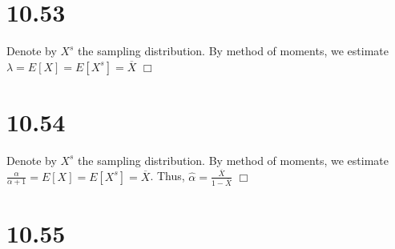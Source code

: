 \documentclass{article}
\begin{document}
\section*{10.53}
Denote by $X^s$ the sampling distribution. By method of moments, we estimate $\lambda = E[X] = E[X^s] = \overline{X}$ $\Box$

\section*{10.54}
Denote by $X^s$ the sampling distribution. By method of moments, we estimate $\frac{\alpha}{\alpha + 1} = E[X] = E[X^s] = \overline{X}$. Thus, $\hat{\alpha} = \frac{\overline{X}}{1-\overline{X}}$ $\Box$

\section*{10.55}
\end{document}
